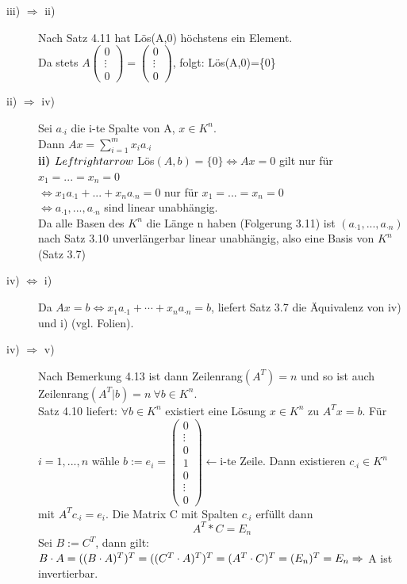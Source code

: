 \documentclass{scrbook}
\begin{document}
\begin{description}
\item[iii) $\Rightarrow$ ii)] Nach Satz 4.11 hat Lös(A,0) höchstens ein Element. \\Da stets $A\left(
\begin{array}{c}
0\\\vdots\\0
\end{array}
\right)=\left(
\begin{array}{c}
0\\\vdots\\0
\end{array}
\right)$, folgt: Lös(A,0)=\{0\}
\item[ii) $\Rightarrow$ iv)] Sei $a_{\cdot i}$ die i-te Spalte von A, $x \in K^n$.\\
Dann $Ax=\sum^m_{i=1} x_i a_{\cdot i}$\\
\textbf{ii)} $\\Leftrightarrow$ Lös$(A,b)=\{0\} \Leftrightarrow Ax=0$ gilt nur für $x_1=...=x_n=0$\\$ \Leftrightarrow x_1 a_{\cdot 1} +...+ x_n a_{\cdot n}=0$ nur für $x_1=...=x_n=0$\\$ \Leftrightarrow a_{\cdot 1},...,a_{\cdot n} $ sind linear unabhängig.\\
Da alle Basen des $K^n$ die Länge n haben (Folgerung 3.11) ist $(a_{\cdot 1},...,a_{\cdot n})$ nach Satz 3.10 unverlängerbar linear unabhängig, also eine Basis von $K^n$ (Satz 3.7)
\item[iv) $\Leftrightarrow$ i)] Da $Ax=b \Leftrightarrow x_1a_{\cdot 1} + \cdots + x_na_{\cdot n} = b$, liefert Satz 3.7 die Äquivalenz von iv) und i) (vgl. Folien).
\item[iv) $\Rightarrow$ v)] Nach Bemerkung 4.13 ist dann Zeilenrang$(A^T)=n$ und so ist auch Zeilenrang$(A^T|b)=n \ \forall b\in K^n$.\\
Satz 4.10 liefert: $\forall b \in K^n$ existiert eine Lösung $x\in K^n$ zu $A^Tx=b$. Für $i=1,...,n$ wähle $b:=e_i=\left(
\begin{array}{c}
0\\\vdots\\0\\1\\0\\\vdots\\0
\end{array}
\right) \leftarrow \text{i-te Zeile}$. Dann existieren $c_{\cdot i} \in K^n$ mit $A^T c_{\cdot i} = e_i$. Die Matrix C mit Spalten $c_{\cdot i}$ erfüllt dann\[A^T * C = E_n\] Sei $B := C^T$, dann gilt: \\$B\cdot A=((B\cdot A)^T)^T = ((C^T\cdot A)^T)^T=(A^T \cdot C)^T = (E_n)^T = E_n \\\Rightarrow$ A ist invertierbar.

\end{description}
\end{document}
